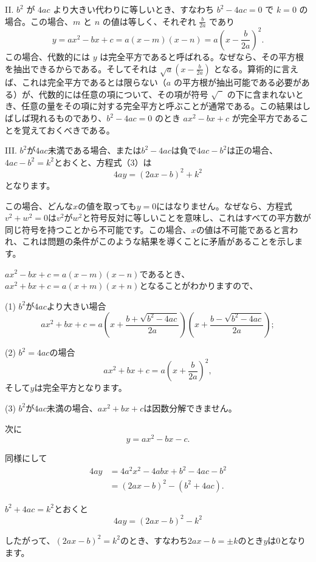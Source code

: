 \documentclass[a4paper,11pt,openany]{ltjsbook}
\newcommand{\Add}[1]{#1}
\newcommand{\Z}{\phantom{0}}
\begin{document}
II. \(b^2\) が \(4ac\) より大きい代わりに等しいとき、すなわち \(b^2 - 4ac = 0\) で \(k = 0\) の場合。この場合、\(m\) と \(n\) の値は等しく、それぞれ \(\frac{b}{2a}\) であり
\[
y = ax^2 - bx + c = a(x - m)(x - n)
  = a \left( x - \frac{b}{2a} \right)^2.
\]
この場合、代数的には \(y\) は完全平方であると呼ばれる。なぜなら、その平方根を抽出できるからである。そしてそれは \(\sqrt{a} \left( x - \frac{b}{2a} \right)\) となる。算術的に言えば、これは完全平方であるとは限らない（\(a\) の平方根が抽出可能である必要がある）が、代数的には任意の項について、その項が符号 \(\sqrt{\Z}\) の下に含まれないとき、任意の量をその項に対する完全平方と呼ぶことが通常である。この結果はしばしば現れるものであり、\(b^2 - 4ac = 0\) のとき \(ax^2 - bx + c\) が完全平方であることを覚えておくべきである。

III. $b^{2}$が$4ac$未満である場合、または$b^{2} - 4ac$は負で$4ac - b^{2}$は正の場合、$4ac - b^{2} = k^{2}$とおくと、方程式（3）は
\[
4ay = (2ax - b)^{2} + k^{2}
\]
となります。

この場合、どんな$x$の値を取っても$y = 0$にはなりません。なぜなら、方程式$v^{2} + w^{2} = 0$は$v^{2}$が$w^{2}$と符号反対に等しいことを意味し、これはすべての平方数が同じ符号を持つことから不可能です。この場合、$x$の値は不可能であると言われ、これは問題の条件がこのような結果を導くことに矛盾があることを示します。

$a x^{2} - b x + c = a(x - m)(x - n)$であるとき、$a x^{2} + b x + c = a(x + m)(x + n)$となることがわかりますので、

(1) $b^{2}$が$4ac$より大きい場合
\[
a x^{2} + b x + c =
  a \left( x + \frac{b + \sqrt{b^{2} - 4ac}}{2a} \right)
   \left( x + \frac{b - \sqrt{b^{2} - 4ac}}{2a} \right);
\]

(2) $b^{2} = 4ac$の場合
\[
a x^{2} + b x + c = a \left( x + \frac{b}{2a} \right)^{2},
\]
そして$y$は完全平方となります。

(3) $b^{2}$が$4ac$未満の場合、$a x^{2} + b x + c$は因数分解できません。

次に
\[
y = a x^{2} - b x - c \Add{.}
\tag{1}
\]

同様にして
\begin{align*}
4ay &= 4a^{2} x^{2} - 4abx + b^{2} - 4ac - b^{2} \\
  &= (2ax - b)^{2} - (b^{2} + 4ac) \Add{.}
\tag{2}
\end{align*}

$b^{2} + 4ac = k^{2}$とおくと
\[
4ay = (2ax - b)^{2} - k^{2} \tag{3}
\]

したがって、$(2ax - b)^{2} = k^{2}$のとき、すなわち$2ax - b = ±k$のとき$y$は$0$となります。
\end{document}
